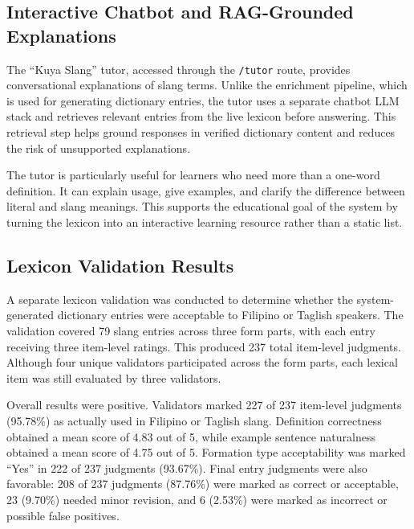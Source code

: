 \subsection{Interactive Chatbot and RAG-Grounded Explanations}
The ``Kuya Slang'' tutor, accessed through the \texttt{/tutor} route, provides conversational explanations of slang terms. Unlike the enrichment pipeline, which is used for generating dictionary entries, the tutor uses a separate chatbot LLM stack and retrieves relevant entries from the live lexicon before answering. This retrieval step helps ground responses in verified dictionary content and reduces the risk of unsupported explanations.

The tutor is particularly useful for learners who need more than a one-word definition. It can explain usage, give examples, and clarify the difference between literal and slang meanings. This supports the educational goal of the system by turning the lexicon into an interactive learning resource rather than a static list.

\subsection{Lexicon Validation Results}
A separate lexicon validation was conducted to determine whether the system-generated dictionary entries were acceptable to Filipino or Taglish speakers. The validation covered 79 slang entries across three form parts, with each entry receiving three item-level ratings. This produced 237 total item-level judgments. Although four unique validators participated across the form parts, each lexical item was still evaluated by three validators.

Overall results were positive. Validators marked 227 of 237 item-level judgments (95.78\%) as actually used in Filipino or Taglish slang. Definition correctness obtained a mean score of 4.83 out of 5, while example sentence naturalness obtained a mean score of 4.75 out of 5. Formation type acceptability was marked ``Yes'' in 222 of 237 judgments (93.67\%). Final entry judgments were also favorable: 208 of 237 judgments (87.76\%) were marked as correct or acceptable, 23 (9.70\%) needed minor revision, and 6 (2.53\%) were marked as incorrect or possible false positives.

